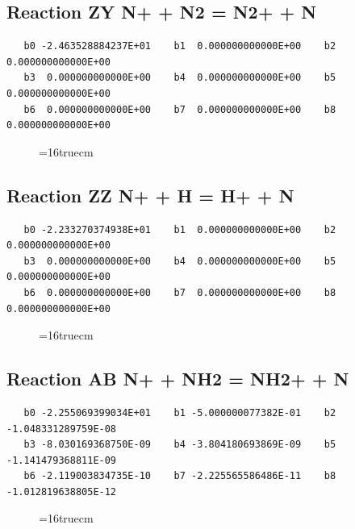 \documentclass[12pt,dvipdfm]{article}
\begin{document}
\subsection{
Reaction ZY N+ + N2 = N2+ + N}
\begin{small}\begin{verbatim}
   b0 -2.463528884237E+01    b1  0.000000000000E+00    b2  0.000000000000E+00
   b3  0.000000000000E+00    b4  0.000000000000E+00    b5  0.000000000000E+00
   b6  0.000000000000E+00    b7  0.000000000000E+00    b8  0.000000000000E+00
   \end{verbatim}\end{small}
\begin{figure}[h!]
\label{n2rates}
\epsfxsize=16truecm
\end{figure}
\newpage

\subsection{
Reaction ZZ N+ + H = H+ + N}
\begin{small}\begin{verbatim}
   b0 -2.233270374938E+01    b1  0.000000000000E+00    b2  0.000000000000E+00
   b3  0.000000000000E+00    b4  0.000000000000E+00    b5  0.000000000000E+00
   b6  0.000000000000E+00    b7  0.000000000000E+00    b8  0.000000000000E+00
   \end{verbatim}\end{small}
\begin{figure}[h!]
\label{n2rates}
\epsfxsize=16truecm
\end{figure}
\newpage

\subsection{
Reaction AB N+ + NH2 = NH2+ + N}
\begin{small}\begin{verbatim}
   b0 -2.255069399034E+01    b1 -5.000000077382E-01    b2 -1.048331289759E-08
   b3 -8.030169368750E-09    b4 -3.804180693869E-09    b5 -1.141479368811E-09
   b6 -2.119003834735E-10    b7 -2.225565586486E-11    b8 -1.012819638805E-12
   \end{verbatim}\end{small}
\begin{figure}[h!]
\label{n2rates}
\epsfxsize=16truecm
\end{figure}
\newpage
\end{document}
